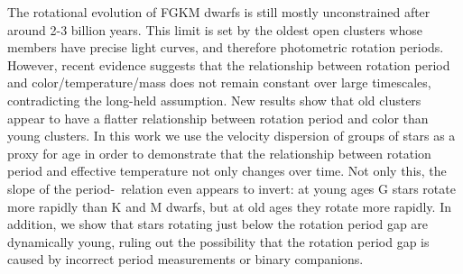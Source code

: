 The rotational evolution of FGKM dwarfs is still mostly unconstrained after
around 2-3 billion years.
This limit is set by the oldest open clusters whose members have precise light
curves, and therefore photometric rotation periods.
However, recent evidence suggests that the relationship between rotation
period and color/temperature/mass does not remain constant over large
timescales, contradicting the long-held assumption.
New results show that old clusters appear to have a flatter relationship
between rotation period and color than young clusters.
In this work we use the velocity dispersion of groups of stars as a proxy for
age in order to demonstrate that the relationship between rotation period and
effective temperature not only changes over time.
Not only this, the slope of the period-\teff\ relation even appears to invert:
at young ages G stars rotate more rapidly than K and M dwarfs, but at old ages
they rotate more rapidly.
In addition, we show that stars rotating just below the rotation period gap
are dynamically young, ruling out the possibility that the rotation period gap
is caused by incorrect period measurements or binary companions.
